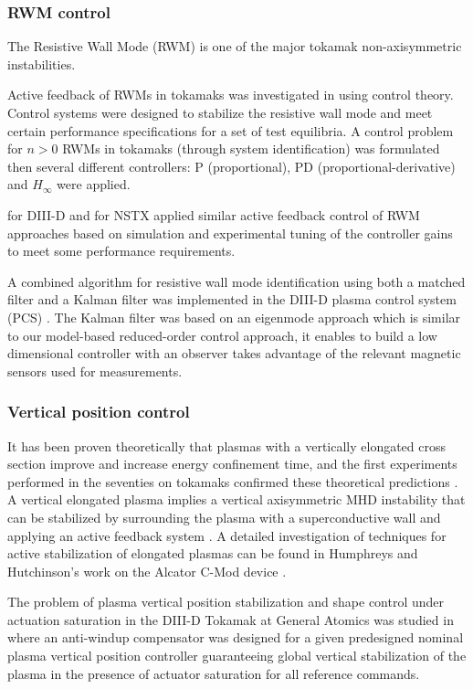 \documentclass[12pt,lot, lof]{puthesis}
\begin{document}
\subsubsection{RWM control}
The Resistive Wall Mode (RWM) is one of the major tokamak non-axisymmetric instabilities.

Active feedback of RWMs in tokamaks was investigated in \cite{Fransson00} using control
theory. Control systems were designed to stabilize the resistive wall mode and meet certain performance specifications for a set of test equilibria. A control problem for $n > 0$ RWMs in tokamaks (through system identification) was formulated then several different controllers: P (proportional), PD (proportional-derivative) and $H_{\infty}$ were applied.

\cite{Garofalo01} for DIII-D and  \cite{Sabbagh04} for NSTX applied similar active feedback control of RWM approaches based on simulation and experimental tuning of the controller gains to meet some performance requirements.

A combined algorithm for resistive wall mode identification using both a matched filter and a Kalman filter was implemented in the DIII-D plasma control system (PCS) \cite{In06}. The Kalman filter was based on an eigenmode approach which is similar to our model-based reduced-order control approach, it enables to build a low dimensional controller with an observer takes advantage of the relevant magnetic sensors used for measurements. 

\subsubsection{Vertical position control}
It has been proven theoretically that plasmas with a vertically elongated cross section improve and increase energy confinement time, and the first experiments performed in the seventies on tokamaks confirmed these theoretical predictions \cite{Pironti05,Robinson78}. A vertical elongated plasma implies a vertical axisymmetric MHD instability that can be stabilized by surrounding the plasma with a superconductive wall \cite{Mori87, Okabayashi74, Blum81} and applying an active feedback system \cite{Rebhan78}. A detailed investigation of techniques for active stabilization of elongated plasmas can be found in Humphreys and Hutchinson's work on the Alcator C-Mod device \cite{Humphreys89}.

The problem of plasma vertical position stabilization and shape control under actuation saturation in the DIII-D Tokamak at General Atomics was studied in \cite{Schuster03} where an anti-windup compensator was designed for a given predesigned nominal plasma vertical position controller guaranteeing global vertical stabilization of the plasma in the presence of actuator saturation for all reference commands.
\end{document}
